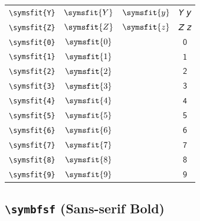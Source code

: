 \documentclass[12pt,a4paper]{article}
\begin{document}
\begin{longtable}{|c|c|c|c|}
\verb|\symsfit{Y}| & $\symsfit{Y}$ & $\symsfit{y}$ & 𝘠 𝘺 \\
\verb|\symsfit{Z}| & $\symsfit{Z}$ & $\symsfit{z}$ & 𝘡 𝘻 \\
\verb|\symsfit{0}| & $\symsfit{0}$ & & $ 𝟢 $ \\
\verb|\symsfit{1}| & $\symsfit{1}$ & & $ 𝟣 $ \\
\verb|\symsfit{2}| & $\symsfit{2}$ & & $ 𝟤 $ \\
\verb|\symsfit{3}| & $\symsfit{3}$ & & $ 𝟥 $ \\
\verb|\symsfit{4}| & $\symsfit{4}$ & & $ 𝟦 $ \\
\verb|\symsfit{5}| & $\symsfit{5}$ & & $ 𝟧 $ \\
\verb|\symsfit{6}| & $\symsfit{6}$ & & $ 𝟨 $ \\
\verb|\symsfit{7}| & $\symsfit{7}$ & & $ 𝟩 $ \\
\verb|\symsfit{8}| & $\symsfit{8}$ & & $ 𝟪 $ \\
\verb|\symsfit{9}| & $\symsfit{9}$ & & $ 𝟫 $ \\
\hline
\end{longtable}

\newpage

\subsection*{\texttt{\textbackslash{}symbfsf} (Sans-serif Bold)}
\end{document}
